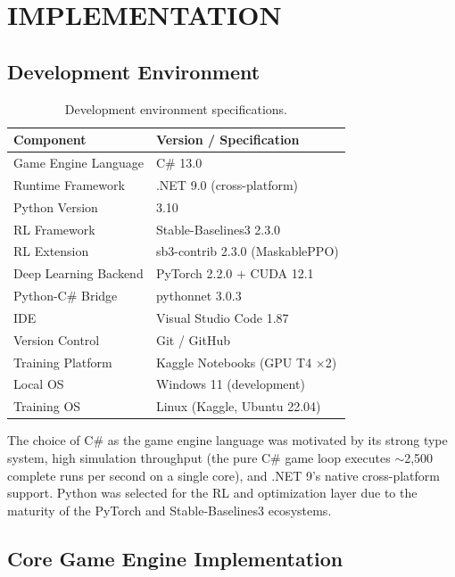 \clearpage
{}
\chapter{IMPLEMENTATION}

\section{Development Environment}

\begin{table}[H]
    \centering
    \caption{Development environment specifications.}
    \label{tab:dev_env}
    \begin{tabular}{ll}
        \toprule
        \textbf{Component} & \textbf{Version / Specification} \\
        \midrule
        Game Engine Language  & C\# 13.0 \\
        Runtime Framework     & .NET 9.0 (cross-platform) \\
        Python Version        & 3.10 \\
        RL Framework          & Stable-Baselines3 2.3.0 \\
        RL Extension          & sb3-contrib 2.3.0 (MaskablePPO) \\
        Deep Learning Backend & PyTorch 2.2.0 + CUDA 12.1 \\
        Python-C\# Bridge     & pythonnet 3.0.3 \\
        IDE                   & Visual Studio Code 1.87 \\
        Version Control       & Git / GitHub \\
        Training Platform     & Kaggle Notebooks (GPU T4 $\times$2) \\
        Local OS              & Windows 11 (development) \\
        Training OS           & Linux (Kaggle, Ubuntu 22.04) \\
        \bottomrule
    \end{tabular}
\end{table}

The choice of C\# as the game engine language was motivated by its strong type system, high simulation throughput (the pure C\# game loop executes $\sim$2,500 complete runs per second on a single core), and .NET 9's native cross-platform support. Python was selected for the RL and optimization layer due to the maturity of the PyTorch and Stable-Baselines3 ecosystems.

\section{Core Game Engine Implementation}


